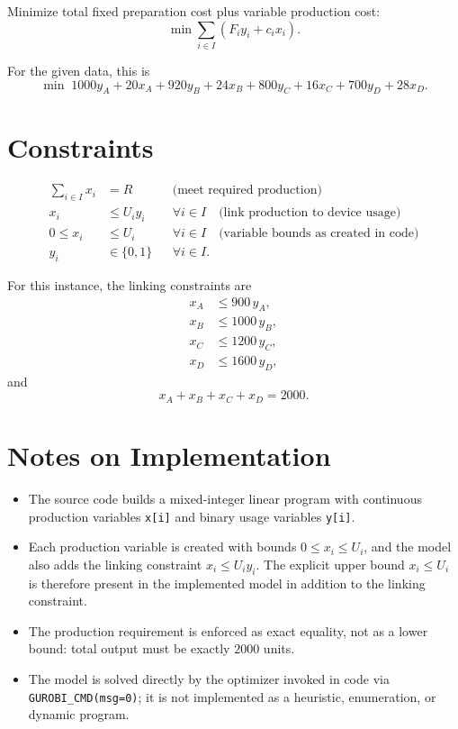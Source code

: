 Minimize total fixed preparation cost plus variable production cost:
\[
\min \sum_{i\in I} \left(F_i y_i + c_i x_i\right).
\]

For the given data, this is
\[
\min\;
1000y_A+20x_A
+920y_B+24x_B
+800y_C+16x_C
+700y_D+28x_D.
\]

\section*{Constraints}

\begin{align}
\sum_{i\in I} x_i &= R
&& \text{(meet required production)}\\
x_i &\le U_i y_i
&& \forall i\in I
\quad \text{(link production to device usage)}\\
0 \le x_i &\le U_i
&& \forall i\in I
\quad \text{(variable bounds as created in code)}\\
y_i &\in \{0,1\}
&& \forall i\in I.
\end{align}

For this instance, the linking constraints are
\begin{align}
x_A &\le 900\,y_A,\\
x_B &\le 1000\,y_B,\\
x_C &\le 1200\,y_C,\\
x_D &\le 1600\,y_D,
\end{align}
and
\[
x_A+x_B+x_C+x_D=2000.
\]

\section*{Notes on Implementation}

\begin{itemize}
    \item The source code builds a mixed-integer linear program with continuous production variables \texttt{x[i]} and binary usage variables \texttt{y[i]}.
    \item Each production variable is created with bounds $0 \le x_i \le U_i$, and the model also adds the linking constraint $x_i \le U_i y_i$. The explicit upper bound $x_i \le U_i$ is therefore present in the implemented model in addition to the linking constraint.
    \item The production requirement is enforced as exact equality, not as a lower bound: total output must be exactly $2000$ units.
    \item The model is solved directly by the optimizer invoked in code via \texttt{GUROBI\_CMD(msg=0)}; it is not implemented as a heuristic, enumeration, or dynamic program.
\end{itemize}
